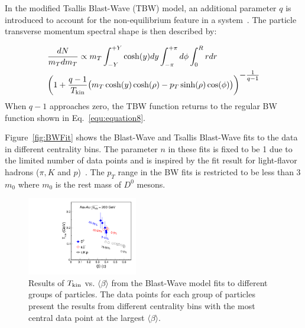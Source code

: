 \documentclass[%
 reprint,	
showpacs,
 amsmath,amssymb,
 aps,
 prc,
]{revtex4-1}
\begin{document}
In the modified Tsallis Blast-Wave (TBW) model, an additional parameter $q$ is introduced to account for the non-equilibrium feature in a system~\cite{Tang:2008ud}. The particle transverse momentum spectral shape is then described by: 

\begin{equation}
  \begin{aligned}
    & \frac{dN}{m_{T}dm_{T}} \propto m_{T}\int_{-Y}^{+Y}\cosh(y)dy \int_{-\pi}^{+\pi} d\phi \int_0^R rdr \\
    & \bigg(1+\frac{q-1}{T_{\rm kin}}\big(m_{T}\cosh(y)\cosh(\rho)-p_{T}\sinh(\rho)\cos(\phi)\big)\bigg)^{\textstyle -\frac{1}{q-1}}
  \end{aligned}
\label{equ:equation10}
\end{equation}
When $q-1$ approaches zero, the TBW function returns to the regular BW function shown in Eq.~\ref{equ:equation8}.


Figure~\ref{fig:BWFit} shows the Blast-Wave and Tsallis Blast-Wave fits to the data in different centrality bins. The parameter $n$ in these fits is fixed to be 1 due to the limited number of data points and is inspired by the fit result for light-flavor hadrons ($\pi,K$ and $p$)~\cite{Tang:2008ud}. The $p_{T}$ range in the BW fits is restricted to be less than 3$m_{0}$ where $m_{0}$ is the rest mass of $D^0$ mesons.

\begin{figure}
\centering
\includegraphics[width=0.43\textwidth]{fig/TvsBeta.pdf}
\caption{Results of $T_{\rm kin}$ vs. $\langle\beta\rangle$ from the Blast-Wave model fits to different groups of particles. The data points for each group of particles present the results from different centrality bins with the most central data point at the largest $\langle\beta\rangle$.}
\label{fig:BWFitSummary} 
\end{figure}
\end{document}
